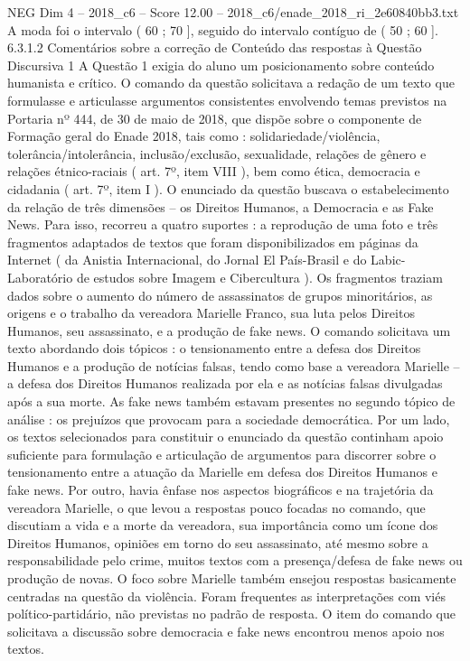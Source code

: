 \begin{textsample}{NEG Dim 4 – 2018\_c6 – Score 12.00 – 2018\_c6/enade\_2018\_ri\_2e60840bb3.txt}
A moda foi o intervalo ( 60 ; 70 ], seguido do intervalo contíguo de ( 50 ; 60 ]. 6.3.1.2 Comentários sobre a correção de Conteúdo das respostas à Questão Discursiva 1 A Questão 1 exigia do aluno um posicionamento sobre conteúdo humanista e crítico.
O comando da questão solicitava a redação de um texto que formulasse e articulasse argumentos consistentes envolvendo temas previstos na Portaria nº 444, de 30 de maio de 2018, que dispõe sobre o componente de Formação geral do Enade 2018, tais como : solidariedade/violência, tolerância/intolerância, inclusão/exclusão, sexualidade, relações de gênero e relações étnico-raciais ( art. 7º, item VIII ), bem como ética, democracia e cidadania ( art. 7º, item I ).
O enunciado da questão buscava o estabelecimento da relação de três dimensões – os Direitos Humanos, a Democracia e as Fake News.
Para isso, recorreu a quatro suportes : a reprodução de uma foto e três fragmentos adaptados de textos que foram disponibilizados em páginas da Internet ( da Anistia Internacional, do Jornal El País-Brasil e do Labic-Laboratório de estudos sobre Imagem e Cibercultura ).
Os fragmentos traziam dados sobre o aumento do número de assassinatos de grupos minoritários, as origens e o trabalho da vereadora Marielle Franco, sua luta pelos Direitos Humanos, seu assassinato, e a produção de fake news.
O comando solicitava um texto abordando dois tópicos : o tensionamento entre a defesa dos Direitos Humanos e a produção de notícias falsas, tendo como base a vereadora Marielle – a defesa dos Direitos Humanos realizada por ela e as notícias falsas divulgadas após a sua morte.
As fake news também estavam presentes no segundo tópico de análise : os prejuízos que provocam para a sociedade democrática.
Por um lado, os textos selecionados para constituir o enunciado da questão continham apoio suficiente para formulação e articulação de argumentos para discorrer sobre o tensionamento entre a atuação da Marielle em defesa dos Direitos Humanos e fake news.
Por outro, havia ênfase nos aspectos biográficos e na trajetória da vereadora Marielle, o que levou a respostas pouco focadas no comando, que discutiam a vida e a morte da vereadora, sua importância como um ícone dos Direitos Humanos, opiniões em torno do seu assassinato, até mesmo sobre a responsabilidade pelo crime, muitos textos com a presença/defesa de fake news ou produção de novas.
O foco sobre Marielle também ensejou respostas basicamente centradas na questão da violência.
Foram frequentes as interpretações com viés político-partidário, não previstas no padrão de resposta.
O item do comando que solicitava a discussão sobre democracia e fake news encontrou menos apoio nos textos.

\end{textsample}
